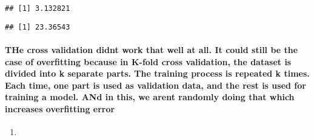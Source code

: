 \documentclass[]{article}
\newenvironment{Shaded}{\begin{snugshade}}{\end{snugshade}}
\newcommand{\DecValTok}[1]{\textcolor[rgb]{0.00,0.00,0.81}{#1}}
\newcommand{\KeywordTok}[1]{\textcolor[rgb]{0.13,0.29,0.53}{\textbf{#1}}}
\newcommand{\NormalTok}[1]{#1}
\newcommand{\OperatorTok}[1]{\textcolor[rgb]{0.81,0.36,0.00}{\textbf{#1}}}
\newcommand{\StringTok}[1]{\textcolor[rgb]{0.31,0.60,0.02}{#1}}
\let\oldparagraph\paragraph
\renewcommand{\paragraph}[1]{\oldparagraph{#1}\mbox{}}
\begin{document}
\begin{verbatim}
## [1] 3.132821
\end{verbatim}

\begin{Shaded}
\end{Shaded}

\begin{verbatim}
## [1] 23.36543
\end{verbatim}

\hypertarget{the-cross-validation-didnt-work-that-well-at-all.-it-could-still-be-the-case-of-overfitting-because-in-k-fold-cross-validation-the-dataset-is-divided-into-k-separate-parts.-the-training-process-is-repeated-k-times.-each-time-one-part-is-used-as-validation-data-and-the-rest-is-used-for-training-a-model.-and-in-this-we-arent-randomly-doing-that-which-increases-overfitting-error}{%
\paragraph{THe cross validation didnt work that well at all. It could
still be the case of overfitting because in K-fold cross validation, the
dataset is divided into k separate parts. The training process is
repeated k times. Each time, one part is used as validation data, and
the rest is used for training a model. ANd in this, we arent randomly
doing that which increases overfitting
error}\label{the-cross-validation-didnt-work-that-well-at-all.-it-could-still-be-the-case-of-overfitting-because-in-k-fold-cross-validation-the-dataset-is-divided-into-k-separate-parts.-the-training-process-is-repeated-k-times.-each-time-one-part-is-used-as-validation-data-and-the-rest-is-used-for-training-a-model.-and-in-this-we-arent-randomly-doing-that-which-increases-overfitting-error}}

\begin{enumerate}
\def\labelenumi{(\alph{enumi})}
\setcounter{enumi}{2}
\item
\end{enumerate}
\end{document}
